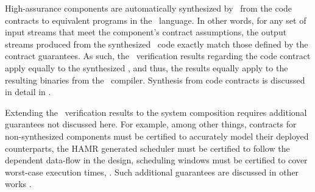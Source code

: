 High-assurance components are automatically synthesized by \splt\ from
the code contracts to equivalent programs in the \ckml\ language.  In
other words, for any set of input streams that meet the component's
contract assumptions, the output streams produced from the synthesized
\ckml\ code exactly match those defined by the contract guarantees.
As such, the \agr\ verification results regarding the code contract
apply equally to the synthesized \ckml, and thus, the results equally
apply to the resulting binaries from the \ckml\ compiler.  Synthesis
from code contracts is discussed in detail in .

Extending the \agr\ verification results to the system composition
requires additional guarantees not discussed here.  For
example, among other things, contracts for non-synthesized components
must be certified to accurately model their deployed counterparts, the
HAMR generated scheduler must be certified to follow the dependent
data-flow in the design, scheduling windows must be certified to cover
worst-case execution times, \etc.  Such additional guarantees are
discussed in other works \cite{gearcase2020, dcrypps2019,
  10.1007/978-3-030-89159-6_18, 10.1007/978-3-030-89159-6_17,
  sel4-2009, scheduled-agree, 9734792}.

